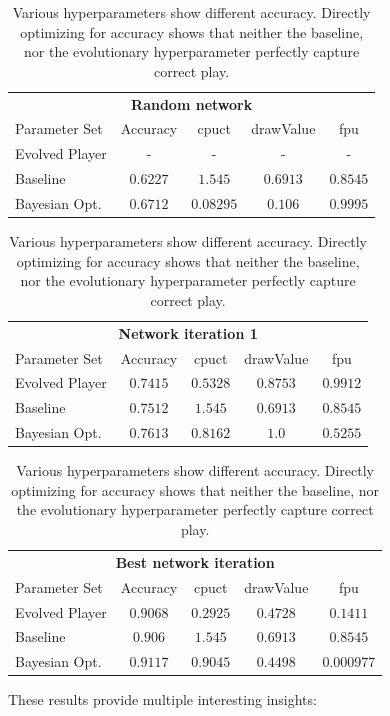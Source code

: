 \documentclass[12pt,onecolumn,oneside,titlepage]{article}
\begin{document}
\begin{table} [H]
 \centering

  \begin{tabular}{ l  c c c c }
  \multicolumn{5}{c}{\textbf{Random network}} \\
  Parameter Set & Accuracy & cpuct & drawValue & fpu \\
  \hline
  Evolved Player & - & - & - & - \\
  Baseline & $0.6227$ & $1.545$ & $0.6913$ & $0.8545$ \\
  Bayesian Opt. & $0.6712$ & $0.08295$ & $0.106$ & $0.9995$ \\
  \end{tabular}
 
 \begin{tabular}{ l c c c c }
 \\
  \multicolumn{5}{c}{\textbf{Network iteration 1}} \\
  Parameter Set & Accuracy & cpuct & drawValue & fpu \\
  \hline
  Evolved Player & $0.7415$ & $0.5328$ & $0.8753$ & $0.9912$ \\
  Baseline & $0.7512$ & $1.545$ & $0.6913$ & $0.8545$ \\
  Bayesian Opt. & $0.7613$ & $0.8162$ & $1.0$ & $0.5255$ \\
  \end{tabular}
  
 \begin{tabular}{ l c c c c }
 \\
  \multicolumn{5}{c}{\textbf{Best network iteration}} \\
  Parameter Set & Accuracy & cpuct & drawValue & fpu \\
  \hline
  Evolved Player & $0.9068$ & $0.2925$ & $0.4728$ & $0.1411$ \\
  Baseline & $0.906$ & $1.545$ & $0.6913$ & $0.8545$ \\
  Bayesian Opt. & $0.9117$ & $0.9045$ & $0.4498$ & $0.000977$ \\
  \end{tabular}
  
  \caption{Various hyperparameters show different accuracy. Directly optimizing for accuracy shows that neither the baseline, nor the evolutionary hyperparameter perfectly capture correct play.}
  \label{t:hyperparam_accuracy}
\end{table}

These results provide multiple interesting insights:
\end{document}
